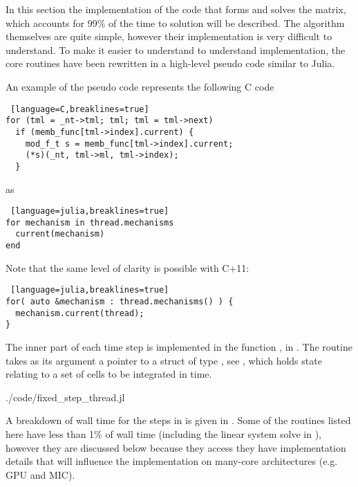 In this section the implementation of the code that forms and solves the matrix, which accounts for 99\% of the time to solution will be described. The algorithm themselves are quite simple, however their implementation is very difficult to understand. To make it easier to understand to understand implementation, the core routines have been rewritten in a high-level pseudo code similar to Julia.

An example of the pseudo code represents the following C code
\begin{shaded}
\begin{lstlisting} [language=C,breaklines=true]
for (tml = _nt->tml; tml; tml = tml->next)
  if (memb_func[tml->index].current) {
    mod_f_t s = memb_func[tml->index].current;
    (*s)(_nt, tml->ml, tml->index);
  }
\end{lstlisting}
\end{shaded}
\noindent as
\begin{shaded}
\begin{lstlisting} [language=julia,breaklines=true]
for mechanism in thread.mechanisms
  current(mechanism)
end
\end{lstlisting}
\end{shaded}
\noindent Note that the same level of clarity is possible with C+11:
\begin{shaded}
\begin{lstlisting} [language=julia,breaklines=true]
for( auto &mechanism : thread.mechanisms() ) {
  mechanism.current(thread);
}
\end{lstlisting}
\end{shaded}

The inner part of each time step is implemented in the function , in . The routine takes as its argument a pointer to a struct of type , see , which holds state relating to a set of cells to be integrated in time.
\begin{shaded}
 {./code/fixed_step_thread.jl}
\end{shaded}

A breakdown of wall time for the steps in  is given in . Some of the routines listed here have less than 1\% of wall time (including the linear system solve in ), however they are discussed below because they access they have implementation details that will influence the implementation on many-core architectures (e.g. GPU and MIC).

